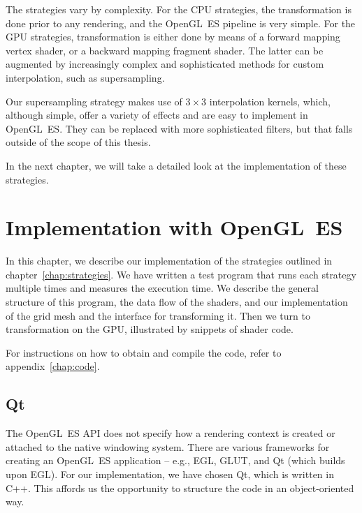 \documentclass[english,12pt]{ifimaster}
\begin{document}
The strategies vary by complexity. For the CPU strategies, the
transformation is done prior to any rendering, and the OpenGL~ES
pipeline is very simple. For the GPU strategies, transformation is
either done by means of a forward mapping vertex shader, or a backward
mapping fragment shader. The latter can be augmented by increasingly
complex and sophisticated methods for custom interpolation, such as
supersampling.

Our supersampling strategy makes use of $3 \times 3$ interpolation
kernels, which, although simple, offer a variety of effects and are
easy to implement in OpenGL~ES. They can be replaced with more
sophisticated filters, but that falls outside of the scope of this
thesis.

In the next chapter, we will take a detailed look at the
implementation of these strategies.

\chapter{Implementation with OpenGL~ES}
\label{chap:opengl}

In this chapter, we describe our implementation of the strategies
outlined in chapter~\ref{chap:strategies}. We have written a test
program that runs each strategy multiple times and measures the
execution time. We describe the general structure of this program, the
data flow of the shaders, and our implementation of the grid mesh and
the interface for transforming it. Then we turn to transformation on
the GPU, illustrated by snippets of shader code.

For instructions on how to obtain and compile the code, refer to
appendix~\ref{chap:code}.


\section{Qt}


The OpenGL~ES API does not specify how a rendering context is created
or attached to the native windowing system. There are various
frameworks for creating an OpenGL~ES application -- e.g., EGL, GLUT,
and Qt (which builds upon EGL). For our implementation, we have chosen
Qt, which is written in C++. This affords us the opportunity to
structure the code in an object-oriented way.
\end{document}
